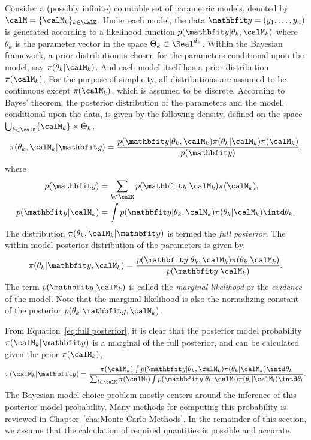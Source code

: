 Consider a (possibly infinite) countable set of parametric models, denoted by
$\calM = \{\calM_k\}_{k\in\calK}$. Under each model, the data $\data =
(y_1,\dots,y_n)$ is generated according to a likelihood function
$p(\data|\theta_k,\calM_k)$ where $\theta_k$ is the parameter vector in the
space $\Theta_k\subset\Real^{d_k}$. Within the Bayesian framework, a prior
distribution is chosen for the parameters conditional upon the model, say
$\pi(\theta_k|\calM_k)$. And each model itself has a prior distribution
$\pi(\calM_k)$. For the purpose of simplicity, all distributions are assumed
to be continuous except $\pi(\calM_k)$, which is assumed to be discrete.
According to Bayes' theorem, the posterior distribution of the parameters and
the model, conditional upon the data, is given by the following density,
defined on the space $\bigcup_{k\in\calK}\{\calM_k\}\times\Theta_k$,
\begin{equation}
  \pi(\theta_k,\calM_k|\data) =
  \frac{p(\data|\theta_k,\calM_k)\pi(\theta_k|\calM_k)\pi(\calM_k)}{p(\data)},
  \label{eq:full posterior}
\end{equation}
where
\begin{align}
  p(\data) &= \sum_{k\in\calK}p(\data|\calM_k)\pi(\calM_k), \\
  p(\data|\calM_k) &=
  \int p(\data|\theta_k,\calM_k)\pi(\theta_k|\calM_k)\intd\theta_k.
  \label{eq:marginal likelihood}
\end{align}
The distribution $\pi(\theta_k,\calM_k|\data)$ is termed the \emph{full
  posterior}. The within model posterior distribution of the parameters is
given by,
\begin{equation}
  \pi(\theta_k|\data,\calM_k) =
  \frac{p(\data|\theta_k,\calM_k)\pi(\theta_k|\calM_k)}{p(\data|\calM_k)}.
  \label{eq:within posterior}
\end{equation}
The term $p(\data|\calM_k)$ is called the \emph{marginal likelihood} or the
\emph{evidence} of the model. Note that the marginal likelihood is also the
normalizing constant of the posterior $p(\theta_k|\data,\calM_k)$.

From Equation~\eqref{eq:full posterior}, it is clear that the posterior model
probability $\pi(\calM_k|\data)$ is a marginal of the full posterior, and can
be calculated given the prior $\pi(\calM_k)$,
\begin{equation}
  \pi(\calM_k|\data) = \frac{
    \pi(\calM_k)
    \int p(\data|\theta_k,\calM_k)\pi(\theta_k|\calM_k)\intd\theta_k
  }{
    \sum_{l\in\calK}\pi(\calM_l)
    \int p(\data|\theta_l,\calM_l)\pi(\theta_l|\calM_l)\intd\theta_l
  }.
  \label{eq:post model prob}
\end{equation}
The Bayesian model choice problem mostly centers around the inference of this
posterior model probability. Many methods for computing this probability is
reviewed in Chapter~\ref{cha:Monte Carlo Methods}. In the remainder of this
section, we assume that the calculation of required quantities is possible and
accurate.


